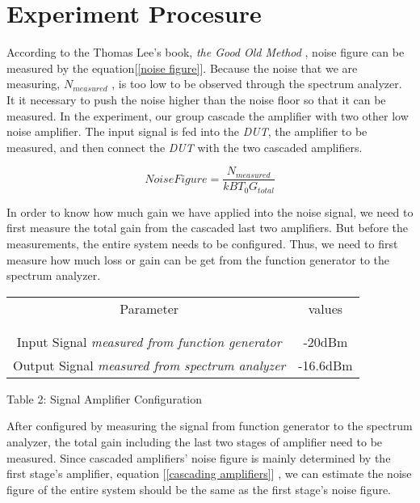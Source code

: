 \documentclass[]{article}
\begin{document}
\section{Experiment Procesure}

According to the Thomas Lee's book, \textit{the Good Old Method} , noise figure can
be measured by the equation[\ref{noise figure}]. Because the noise that we are 
measuring, $N_{measured}$ , is too low to be observed through the spectrum analyzer.
It it necessary to push the noise higher than the noise floor so that it can be measured.
In the experiment, our group cascade the amplifier with two other low noise amplifier.
The input signal is fed into the \textit{DUT}, the amplifier to be measured, and then 
connect the \textit{DUT} with the two cascaded amplifiers.

\begin{equation}
    Noise Figure = \frac{N_{measured}}{kBT_{0}G_{total}}
    \label{noise figure}
\end{equation}

In order to know how much gain we have applied into the noise signal, we need to first 
measure the total gain from the cascaded last two amplifiers. But before the measurements,
the entire system needs to be configured. Thus, we need to first measure how much loss 
or gain can be get from the function generator to the spectrum analyzer.

\begin{center}
    \begin{tabular}{c c}
        Parameter & values \\ \\ \hline \\
        Input Signal \textit{measured from function generator} & -20dBm \\
        Output Signal \textit{measured from spectrum analyzer} & -16.6dBm
    \end{tabular}
\end{center}

\begin{center}
    Table 2: Signal Amplifier Configuration
\end{center}

After configured by measuring the signal from function generator to the spectrum analyzer,
the total gain including the last two stages of amplifier need to be measured. Since cascaded
amplifiers' noise figure is mainly determined by the first stage's amplifier, equation
[\ref{cascading amplifiers}] , we can estimate the noise figure of the entire system should
be the same as the first stage's noise figure.
\end{document}
